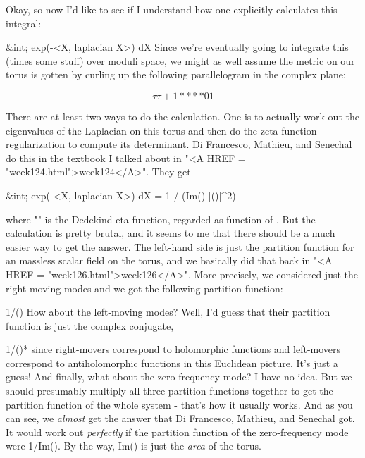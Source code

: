 Okay, so now I'd like to see if I understand how one explicitly
calculates this integral:

                 &int; exp(-<X, laplacian X>) dX
Since we're eventually going to integrate this (times some stuff) over
moduli space, we might as well assume the metric on our torus is gotten
by curling up the following parallelogram in the complex plane:



$$

                         \tau            \tau  + 1 
                         *             *




                      *              *
                      0              1
$$
    

There are at least two ways to do the calculation.  One is to actually
work out the eigenvalues of the Laplacian on this torus and then do the
zeta function regularization to compute its determinant.  Di Francesco,
Mathieu, and Senechal do this in the textbook I talked about in "<A
HREF = "week124.html">week124</A>".  They get

      &int; exp(-<X, laplacian X>) dX = 1 / (\sqrt Im(\tau )  |\eta (\tau )|^{2})

where "\eta " is the Dedekind eta function, regarded as function
of \tau .  But the calculation is pretty brutal, and it seems to me that
there should be a much easier way to get the answer.  The left-hand side
is just the partition function for an massless scalar field on the
torus, and we basically did that back in "<A HREF =
"week126.html">week126</A>".  More precisely, we considered just
the right-moving modes and we got the following partition function:

                           1/\eta (\tau )
How about the left-moving modes?  Well, I'd guess that their partition 
function is just the complex conjugate,

                           1/\eta (\tau )*
since right-movers correspond to holomorphic functions and left-movers
correspond to antiholomorphic functions in this Euclidean picture.  It's
just a guess!  And finally, what about the zero-frequency mode?  I have
no idea.  But we should presumably multiply all three partition
functions together to get the partition function of the whole system -
that's how it usually works.  And as you can see, we \emph{almost} get the
answer that Di Francesco, Mathieu, and Senechal got.  It would work out
\emph{perfectly} if the partition function of the zero-frequency mode were
1/\sqrt Im(\tau ).  By the way, Im(\tau ) is just the \emph{area} of the
torus.

